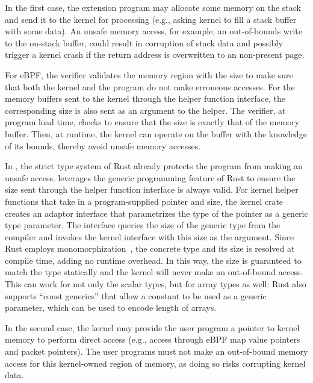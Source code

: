 In the first case, the extension program may allocate some memory on the stack
    and send it to the kernel for processing (e.g., asking kernel to fill a
    stack buffer with some data).
An unsafe memory access, for example, an out-of-bounds write to the on-stack
    buffer, could result in corruption of stack data and possibly trigger a
    kernel crash if the return address is overwritten to an non-present page.

For eBPF, the verifier validates the memory region with the size to make sure
    that both the kernel and the program do not make erroneous accesses.
For the memory buffers sent to the kernel through the helper function interface,
    the corresponding size is also sent as an argument to the helper.
The verifier, at program load time, checks to ensure that the size is exactly
    that of the memory buffer.
Then, at runtime, the kernel can operate on the buffer with the knowledge of
    its bounds, thereby avoid unsafe memory accesses.

In \projname{}, the strict type system of Rust already protects the program
    from making an unsafe access.
\projname{} leverages the generic programming feature of Rust to ensure the
    size sent through the helper function interface is always valid.
For kernel helper functions that take in a
    program-supplied pointer and size, the \projname{} kernel crate creates an
    adaptor interface that parametrizes the type of the pointer as a generic
    type parameter.
The interface queries the size of the generic type from the compiler
    and invokes the kernel interface with this size as the argument.
Since Rust employs monomorphization~\cite{rustc-monomorphize}, the concrete
    type and its size is resolved at compile time, adding no runtime overhead.
In this way, the size is guaranteed to match the type statically and the
    kernel will never make an out-of-bound access.
This can work for not only the scalar types, but for array types as well: Rust
    also supports ``const generics'' that allow a constant to be used as a
    generic parameter, which can be used to encode length of arrays.

In the second case, the kernel may provide the user program a pointer to
    kernel memory to perform direct access (e.g., access through eBPF map value
    pointers and packet pointers).
The user programs must not make an out-of-bound memory access for this
    kernel-owned region of memory, as doing so risks corrupting kernel data.

